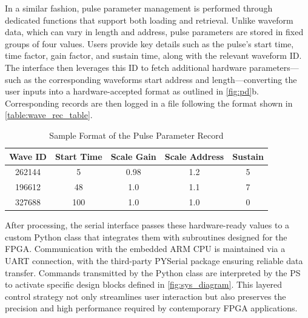 In a similar fashion, pulse parameter management is performed through dedicated functions that support both loading and retrieval. Unlike waveform data, which can vary in length and address, pulse parameters are stored in fixed groups of four values. Users provide key details such as the pulse's start time, time factor, gain factor, and sustain time, along with the relevant waveform ID. The interface then leverages this ID to fetch additional hardware parameters—such as the corresponding waveforms start address and length—converting the user inputs into a hardware-accepted format as outlined in \autoref{fig:pd}b. Corresponding records are then logged in a file following the format shown in \autoref{table:wave_rec_table}.

\begin{table}[h]
\setlength{\abovecaptionskip}{5pt}    %
\setlength{\belowcaptionskip}{5pt}    %
\centering
\caption{Sample Format of the Pulse Parameter Record}
\label{table:wave_rec_table}
\begin{tabular}{|c|c|c|c|c|}
\hline
Wave ID & Start Time & Scale Gain & Scale Address & Sustain \\
\hline
262144 & 5 & 0.98 & 1.2 & 5\\
\hline
196612 & 48 & 1.0 & 1.1 & 7\\
\hline
327688 & 100 & 1.0 & 1.0 & 0\\
\hline
\end{tabular}
\end{table}

After processing, the serial interface passes these hardware-ready values to a custom Python class that integrates them with subroutines designed for the FPGA. Communication with the embedded ARM CPU is maintained via a UART connection, with the third-party PYSerial package ensuring reliable data transfer. Commands transmitted by the Python class are interpreted by the PS to activate specific design blocks defined in \autoref{fig:sys_diagram}. This layered control strategy not only streamlines user interaction but also preserves the precision and high performance required by contemporary FPGA applications.